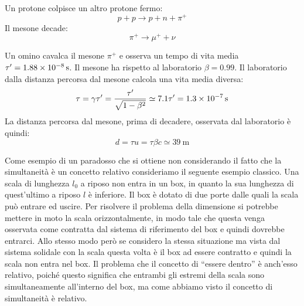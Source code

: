 \begin{Es}
   Un protone colpisce un altro protone fermo:
   \[p+p\rightarrow p+n+\pi^+\]
   Il mesone decade:
   \[\pi^+ \rightarrow \mu ^+ + \nu\]

   Un omino cavalca il mesone $\pi^+$ e osserva un tempo di vita media $\tau'=\SI{1.88E-8}{\second}$. Il mesone ha rispetto al laboratorio $\beta=0.99$. Il laboratorio dalla distanza percorsa dal mesone calcola una vita media diversa:
   \[\tau=\gamma\tau'=\frac{\tau'}{\sqrt{1-\beta^2}}\simeq 7.1\tau'=\SI{1.3E-7}{\second} \]
   La distanza percorsa dal mesone, prima di decadere, osservata dal laboratorio è quindi:
   \[d=\tau u=\tau \beta c\simeq \SI{39}{\metre} \]
\end{Es}

\begin{Es}
   Come esempio di un paradosso che si ottiene non considerando il fatto che la simultaneità è un concetto relativo consideriamo il seguente esempio classico. Una scala di lunghezza $l_0$ a riposo non entra in un box, in quanto la sua lunghezza di quest'ultimo a riposo $l$ è inferiore. Il box è dotato di due porte dalle quali la scala può entrare ed uscire. Per risolvere il problema della dimensione si potrebbe mettere in moto la scala orizzontalmente, in modo tale che questa venga osservata come contratta dal sistema di riferimento del box e quindi dovrebbe entrarci. Allo stesso modo però se considero la stessa situazione ma vista dal sistema solidale con la scala questa volta è il box ad essere contratto e quindi la scala non entra nel box. Il problema che il concetto di ``essere dentro'' è anch'esso relativo, poiché questo significa che entrambi gli estremi della scala sono simultaneamente all'interno del box, ma come abbiamo visto il concetto di simultaneità è relativo.
\end{Es}

